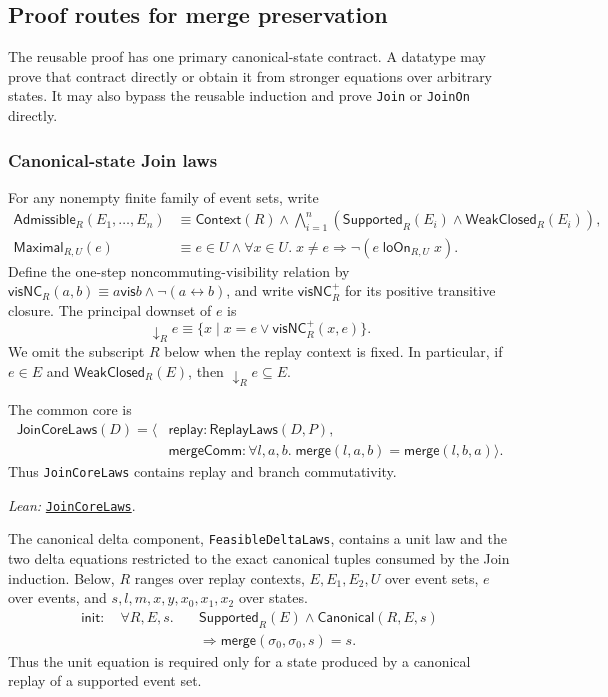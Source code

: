 \documentclass[11pt]{article}
\theoremstyle{definition}
\newcommand{\init}{\sigma_0}
\newcommand{\merge}{\mathsf{merge}}
\newcommand{\vis}{\mathrel{\mathsf{vis}}}
\newcommand{\loOn}{\mathsf{loOn}}
\newcommand{\Can}{\mathsf{Canonical}}
\newcommand{\lean}[1]{\texttt{#1}}
\newcommand{\src}[2]{\href{../../#1}{\texttt{#2}}}
\newcommand{\anchor}[2]{\par\smallskip\noindent\emph{Lean: }\src{#1}{#2}.}
\begin{document}
\subsection{Proof routes for merge preservation}

The reusable proof has one primary canonical-state contract. A datatype may
prove that contract directly or obtain it from stronger equations over
arbitrary states. It may also bypass the reusable induction and prove
\lean{Join} or \lean{JoinOn} directly.

\subsubsection{Canonical-state Join laws}

For any nonempty finite family of event sets, write
\[
\begin{aligned}
 \mathsf{Admissible}_R(E_1,\ldots,E_n)&\equiv
   \mathsf{Context}(R)
   \land\bigwedge_{i=1}^{n}
     (\mathsf{Supported}_R(E_i)\land\mathsf{WeakClosed}_R(E_i)),\\
 \mathsf{Maximal}_{R,U}(e)&\equiv e\in U\land
   \forall x\in U.\;x\ne e\Rightarrow\neg(e\;\loOn_{R,U}\;x).
\end{aligned}
\]
Define the one-step noncommuting-visibility relation by
$\mathsf{visNC}_R(a,b)\equiv a\vis b\land\neg(a\leftrightarrow b)$, and write
$\mathsf{visNC}_R^{+}$ for its positive transitive closure.  The principal
downset of $e$ is
\[
 \downarrow_R e
 \equiv
 \{x\mid x=e\lor\mathsf{visNC}_R^{+}(x,e)\}.
\]
We omit the subscript $R$ below when the replay context is fixed.  In
particular, if $e\in E$ and $\mathsf{WeakClosed}_R(E)$, then
$\downarrow_R e\subseteq E$.

The common core is
\[
\begin{aligned}
 \mathsf{JoinCoreLaws}(D)=\langle
 &\mathsf{replay}:\mathsf{ReplayLaws}(D,P),\\
 &\mathsf{mergeComm}:\forall l,a,b.\;
   \merge(l,a,b)=\merge(l,b,a)\rangle.
\end{aligned}
\]
Thus \lean{JoinCoreLaws} contains replay and branch commutativity.
\anchor{Sal/MRDTs/Framework/MergeLaws.lean}{JoinCoreLaws}

The canonical delta component, \lean{FeasibleDeltaLaws}, contains a unit law
and the two delta equations restricted to the exact canonical tuples consumed
by the Join induction. Below, $R$ ranges over replay contexts,
$E,E_1,E_2,U$ over event sets, $e$ over events, and
$s,l,m,x,y,x_0,x_1,x_2$ over states.
\[
\begin{aligned}
 \mathsf{init}:\quad
 \forall R,E,s.\quad
 &\mathsf{Supported}_R(E)\land\Can(R,E,s)\\
 &\Longrightarrow \merge(\init,\init,s)=s.
\end{aligned}
\]
Thus the unit equation is required only for a state produced by a canonical
replay of a supported event set.
\end{document}
